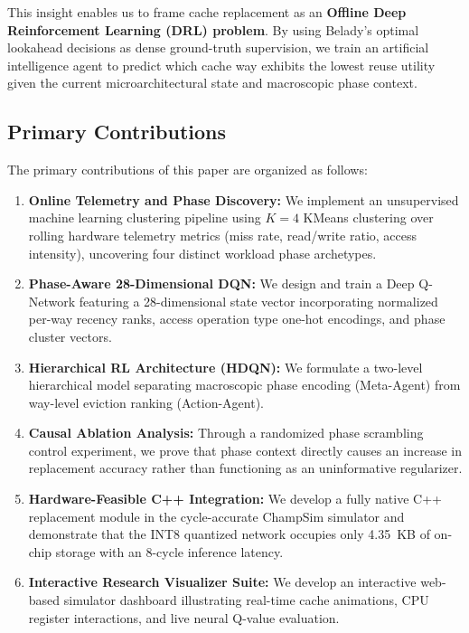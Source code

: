 \documentclass[conference]{IEEEtran}
\begin{document}
This insight enables us to frame cache replacement as an \textbf{Offline Deep Reinforcement Learning (DRL) problem}. By using Belady's optimal lookahead decisions as dense ground-truth supervision, we train an artificial intelligence agent to predict which cache way exhibits the lowest reuse utility given the current microarchitectural state and macroscopic phase context.

\subsection{Primary Contributions}
The primary contributions of this paper are organized as follows:
\begin{enumerate}
    \item \textbf{Online Telemetry and Phase Discovery:} We implement an unsupervised machine learning clustering pipeline using $K=4$ KMeans clustering over rolling hardware telemetry metrics (miss rate, read/write ratio, access intensity), uncovering four distinct workload phase archetypes.
    \item \textbf{Phase-Aware 28-Dimensional DQN:} We design and train a Deep Q-Network featuring a 28-dimensional state vector incorporating normalized per-way recency ranks, access operation type one-hot encodings, and phase cluster vectors.
    \item \textbf{Hierarchical RL Architecture (HDQN):} We formulate a two-level hierarchical model separating macroscopic phase encoding (Meta-Agent) from way-level eviction ranking (Action-Agent).
    \item \textbf{Causal Ablation Analysis:} Through a randomized phase scrambling control experiment, we prove that phase context directly causes an increase in replacement accuracy rather than functioning as an uninformative regularizer.
    \item \textbf{Hardware-Feasible C++ Integration:} We develop a fully native C++ replacement module in the cycle-accurate ChampSim simulator and demonstrate that the INT8 quantized network occupies only 4.35~KB of on-chip storage with an 8-cycle inference latency.
    \item \textbf{Interactive Research Visualizer Suite:} We develop an interactive web-based simulator dashboard illustrating real-time cache animations, CPU register interactions, and live neural Q-value evaluation.
\end{enumerate}

\end{document}
